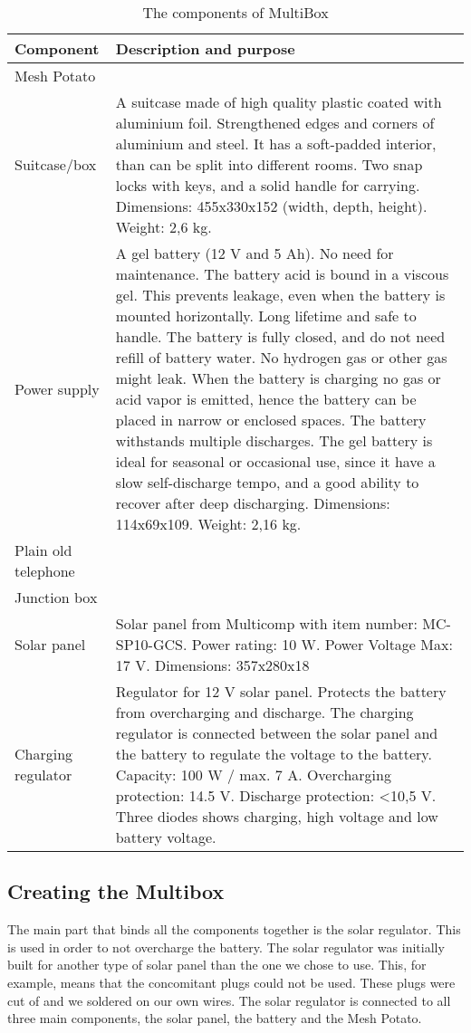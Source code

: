 \begin{center}
\begin{table}[t]
\caption{\label{tab:components}The components of MultiBox}
    \begin{tabular}{ | l | p{9cm} |}
    \hline
    \textbf{Component} & \textbf{Description and purpose} \\ 
    \hline
    Mesh Potato &  \\ 
    \hline
    Suitcase/box &  A suitcase made of high quality plastic coated with aluminium foil. Strengthened edges and corners of aluminium and steel. It has a soft-padded interior, than can be split into different rooms. Two snap locks with keys, and a solid handle for carrying. Dimensions: 455x330x152 (width, depth, height). Weight: 2,6 kg. \\ 
    \hline
    Power supply & A gel battery (12 V and 5 Ah). No need for maintenance. The battery acid is bound in a viscous gel. This prevents leakage, even when the battery is mounted horizontally. Long lifetime and safe to handle. The battery is fully closed, and do not need refill of battery water. No hydrogen gas or other gas might leak. When the battery is charging no gas or acid vapor is emitted, hence the battery can be placed in narrow or enclosed spaces. The battery withstands multiple discharges. The gel battery is ideal for seasonal or occasional use, since it have a slow self-discharge tempo, and a good ability to recover after deep discharging. Dimensions: 114x69x109. Weight: 2,16 kg. \\
    \hline
    Plain old telephone & \\
	\hline
	Junction box & \\
	\hline
	Solar panel & Solar panel from Multicomp with item number: MC-SP10-GCS. Power rating: 10 W. Power Voltage Max: 17 V. Dimensions: 357x280x18\\
	\hline
	Charging regulator & Regulator for 12 V solar panel. Protects the battery from overcharging and discharge. The charging regulator is connected between the solar panel and the battery to regulate the voltage to the battery. Capacity: 100 W / max. 7 A. Overcharging protection: 14.5 V. Discharge protection: <10,5 V. Three diodes shows charging, high voltage and low battery voltage. \\
	\hline
    \end{tabular}
   \end{table}
\end{center}

\subsection{Creating the Multibox}
The main part that binds all the components together is the solar regulator. This is used in order to not overcharge the battery. The solar regulator was initially built for another type of solar panel than the one we chose to use. This, for example, means that the concomitant plugs could not be used. These plugs were cut of and we soldered on our own wires. The solar regulator is connected to all three main components, the solar panel, the battery and the Mesh Potato. 

